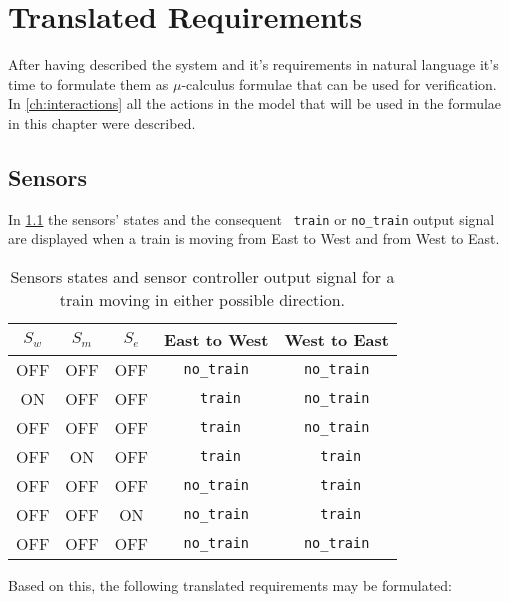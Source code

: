 \documentclass[final]{report}
\begin{document}
\chapter{Translated Requirements}
After having described the system and it's requirements in natural language it's time to formulate them as $\mu$-calculus formulae that can be used for verification. In \cref{ch:interactions} all the actions in the model that will be used in the formulae in this chapter were described.

\section{Sensors}
In \cref{tab:sensors_transitions} the sensors' states and the consequent \texttt{    train} or \texttt{no\_train} output signal are displayed when a train is moving from East to West and from West to East.

\begin{table}[H]
\centering
    \begin{tabular}{|c|c|c|c|c|}
    \hline 
    $S_{w}$ & $S_{m}$ & $S_{e}$ & East to West       & West to East       \\ \hline 
    OFF     & OFF     & OFF     & \texttt{no\_train} & \texttt{no\_train} \\ \hline 
    ON      & OFF     & OFF     & \texttt{    train} & \texttt{no\_train} \\ \hline 
    OFF     & OFF     & OFF     & \texttt{    train} & \texttt{no\_train} \\ \hline 
    OFF     & ON      & OFF     & \texttt{    train} & \texttt{    train} \\ \hline 
    OFF     & OFF     & OFF     & \texttt{no\_train} & \texttt{    train} \\ \hline 
    OFF     & OFF     & ON      & \texttt{no\_train} & \texttt{    train} \\ \hline 
    OFF     & OFF     & OFF     & \texttt{no\_train} & \texttt{no\_train} \\ \hline 
    \end{tabular}
    \caption{Sensors states and sensor controller output signal for a train moving in either possible direction.}
    \label{tab:sensors_transitions}
\end{table}

Based on this, the following translated requirements may be formulated: 
\end{document}
